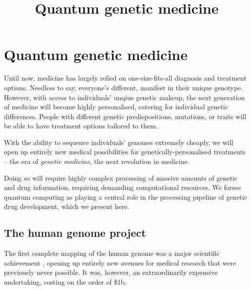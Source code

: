 \documentclass[aps,pra,twocolumn,amsmath,amssymb,nofootinbib,superscriptaddress]{revtex4}
\begin{document}


\title{Quantum genetic medicine}

\frenchspacing

\maketitle

%
%

\section{Quantum genetic medicine}

Until now, medicine has largely relied on one-size-fits-all diagnosis and treatment options. Needless to say, everyone's different, manifest in their unique genotype. However, with access to individuals' unqiue genetic makeup, the next generation of medicine will become highly personalised, catering for individual genetic differences. People with different genetic predispositions, mutations, or traits will be able to have treatment options tailored to them.

With the ability to sequence individuals' genomes extremely cheaply, we will open up entirely new medical possibilities for genetically-personalised treatments -- the era of \textit{genetic medicine}, the next revolution in medicine.

Doing so will require highly complex processing of massive amounts of genetic and drug information, requiring demanding computational resources. We forsee quantum computing as playing a central role in the processing pipeline of genetic drug development, which we present here.

%
%

\subsection{The human genome project}

The first complete mapping of the human genome was a major scientific achievement \cite{humanGenomeProject}, opening up entirely new avenues for medical research that were previously never possible. It was, however, an extraordinarily expensive undertaking, costing on the order of \$1b.
\end{document}
